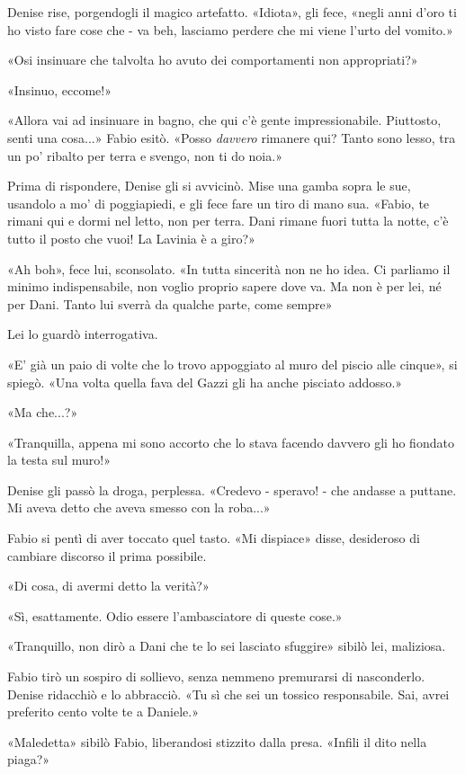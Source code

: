 Denise rise, porgendogli il magico artefatto. «Idiota», gli fece, «negli anni d'oro ti ho visto fare cose che - va beh, lasciamo perdere che mi viene l'urto del vomito.»

«Osi insinuare che talvolta ho avuto dei comportamenti non appropriati?»

«Insinuo, eccome!»

«Allora vai ad insinuare in bagno, che qui c'è gente impressionabile. Piuttosto, senti una cosa...» Fabio esitò. «Posso \emph{davvero} rimanere qui? Tanto sono lesso, tra un po' ribalto per terra e svengo, non ti do noia.»

Prima di rispondere, Denise gli si avvicinò. Mise una gamba sopra le sue, usandolo a mo' di poggiapiedi, e gli fece fare un tiro di mano sua. «Fabio, te rimani qui e dormi nel letto, non per terra. Dani rimane fuori tutta la notte, c'è tutto il posto che vuoi! La Lavinia è a giro?»

«Ah boh», fece lui, sconsolato. «In tutta sincerità non ne ho idea. Ci parliamo il minimo indispensabile, non voglio proprio sapere dove va. Ma non è per lei, né per Dani. Tanto lui sverrà da qualche parte, come sempre»

Lei lo guardò interrogativa.

«E' già un paio di volte che lo trovo appoggiato al muro del piscio alle cinque», si spiegò. «Una volta quella fava del Gazzi gli ha anche pisciato addosso.»

«Ma che...?»

«Tranquilla, appena mi sono accorto che lo stava facendo davvero gli ho fiondato la testa sul muro!»

Denise gli passò la droga, perplessa. «Credevo - speravo! - che andasse a puttane. Mi aveva detto che aveva smesso con la roba...»

Fabio si pentì di aver toccato quel tasto. «Mi dispiace» disse, desideroso di cambiare discorso il prima possibile.

«Di cosa, di avermi detto la verità?»

«Sì, esattamente. Odio essere l'ambasciatore di queste cose.»

«Tranquillo, non dirò a Dani che te lo sei lasciato sfuggire» sibilò lei, maliziosa.

Fabio tirò un sospiro di sollievo, senza nemmeno premurarsi di nasconderlo. Denise ridacchiò e lo abbracciò. «Tu sì che sei un tossico responsabile. Sai, avrei preferito cento volte te a Daniele.»

«Maledetta» sibilò Fabio, liberandosi stizzito dalla presa. «Infili il dito nella piaga?»

